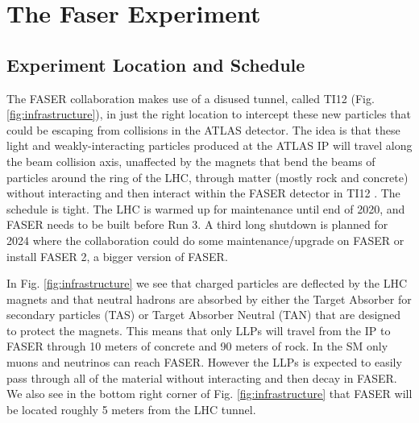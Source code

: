 \chapter{The Faser Experiment}

\ifpdf
    \graphicspath{{ChapterFaser/Figs/Raster/}{Chapter3/Figs/PDF/}{Chapter3/Figs/}}
\else
    \graphicspath{{ChapterFaser/Figs/Vector/}{Chapter3/Figs/}}
\fi


\section{Experiment Location and Schedule}


The FASER collaboration makes use of a disused tunnel, called TI12 (Fig. \ref{fig:infrastructure}), in just the right location to intercept these new particles that could be escaping from collisions in the ATLAS detector. The idea is that these light and weakly-interacting particles produced at the ATLAS IP will travel along the beam collision axis, unaffected by the magnets that bend the beams of particles around the ring of the LHC, through matter (mostly rock and concrete) without interacting and then interact within the FASER detector in TI12 \cite{faser_collaboration_faser:_2019}. The schedule is tight. The LHC is warmed up for maintenance until end of 2020, and FASER needs to be built before Run 3. A third long shutdown is planned for 2024 where the collaboration could do some maintenance/upgrade on FASER or install FASER 2, a bigger version of FASER.

In Fig. \ref{fig:infrastructure} we see that charged particles are deflected by the LHC magnets and that neutral hadrons are absorbed by either the Target Absorber for secondary particles (TAS) or Target Absorber Neutral (TAN) that are designed to protect the magnets. This means that only LLPs will travel from the IP to FASER through 10 meters of concrete and 90 meters of rock. In the SM only muons and neutrinos can reach FASER. However the LLPs is expected to easily pass through all of the material without interacting and then decay in FASER. We also see in the bottom right corner of Fig. \ref{fig:infrastructure} that FASER will be located roughly 5 meters from the LHC tunnel.

